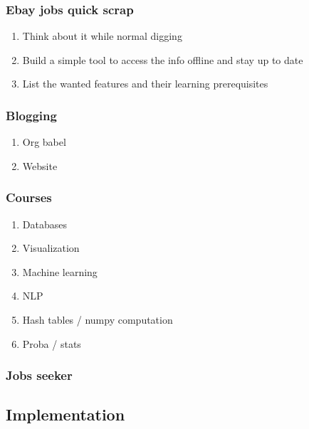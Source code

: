 \documentclass[11pt]{article}
\begin{document}
\subsubsection{Ebay jobs quick scrap}
\label{sec:orgb52a3e2}
\begin{enumerate}
\item Think about it while normal digging
\label{sec:org943e3e7}
\item Build a simple tool to access the info offline and stay up to date
\label{sec:org183919c}
\item List the wanted features and their learning prerequisites
\label{sec:orgf12c628}
\end{enumerate}
\subsubsection{Blogging}
\label{sec:org01462ee}
\begin{enumerate}
\item Org babel
\label{sec:orgc088fe8}
\item Website
\label{sec:org3fdd88e}
\end{enumerate}
\subsubsection{Courses}
\label{sec:orge6f4216}
\begin{enumerate}
\item Databases
\label{sec:orgc7797f3}
\item Visualization
\label{sec:org3a80613}
\item Machine learning
\label{sec:org79df7f9}
\item NLP
\label{sec:org93bbaa9}
\item Hash tables / numpy computation
\label{sec:org870dae6}
\item Proba / stats
\label{sec:orgeb743f5}
\end{enumerate}
\subsubsection{Jobs seeker}
\label{sec:orgefbdabc}
\subsection{Implementation}
\label{sec:orgadb3841}
\end{document}
